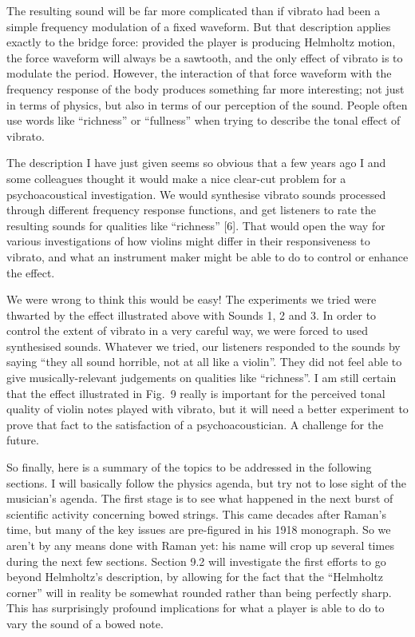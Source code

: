   The resulting sound will be far more complicated than if vibrato had been a 
  simple frequency modulation of a fixed waveform. But that description applies 
  exactly to the bridge force: provided the player is producing Helmholtz 
  motion, the force waveform will always be a sawtooth, and the only effect of 
  vibrato is to modulate the period. However, the interaction of that force 
  waveform with the frequency response of the body produces something far more 
  interesting; not just in terms of physics, but also in terms of our 
  perception of the sound. People often use words like “richness” or “fullness” 
  when trying to describe the tonal effect of vibrato. 

  The description I have just given seems so obvious that a few years ago I and 
  some colleagues thought it would make a nice clear-cut problem for a 
  psychoacoustical investigation. We would synthesise vibrato sounds processed 
  through different frequency response functions, and get listeners to rate the 
  resulting sounds for qualities like “richness” [6]. That would open the way 
  for various investigations of how violins might differ in their 
  responsiveness to vibrato, and what an instrument maker might be able to do 
  to control or enhance the effect. 

  We were wrong to think this would be easy! The experiments we tried were 
  thwarted by the effect illustrated above with Sounds 1, 2 and 3. In order to 
  control the extent of vibrato in a very careful way, we were forced to used 
  synthesised sounds. Whatever we tried, our listeners responded to the sounds 
  by saying “they all sound horrible, not at all like a violin”. They did not 
  feel able to give musically-relevant judgements on qualities like “richness”. 
  I am still certain that the effect illustrated in Fig.\ 9 really is important 
  for the perceived tonal quality of violin notes played with vibrato, but it 
  will need a better experiment to prove that fact to the satisfaction of a 
  psychoacoustician. A challenge for the future. 

  So finally, here is a summary of the topics to be addressed in the following 
  sections. I will basically follow the physics agenda, but try not to lose 
  sight of the musician’s agenda. The first stage is to see what happened in 
  the next burst of scientific activity concerning bowed strings. This came 
  decades after Raman’s time, but many of the key issues are pre-figured in his 
  1918 monograph. So we aren’t by any means done with Raman yet: his name will 
  crop up several times during the next few sections. Section 9.2 will 
  investigate the first efforts to go beyond Helmholtz’s description, by 
  allowing for the fact that the “Helmholtz corner” will in reality be somewhat 
  rounded rather than being perfectly sharp. This has surprisingly profound 
  implications for what a player is able to do to vary the sound of a bowed 
  note. 

